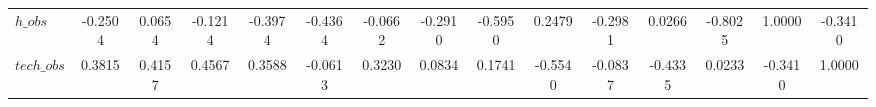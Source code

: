 \begin{center}
\begin{longtable}{lcccccccccccccc}
$h\_obs         $	 & 	          -0.2504	 & 	           0.0654	 & 	          -0.1214	 & 	          -0.3974	 & 	          -0.4364	 & 	          -0.0662	 & 	          -0.2910	 & 	          -0.5950	 & 	           0.2479	 & 	          -0.2981	 & 	           0.0266	 & 	          -0.8025	 & 	           1.0000	 & 	          -0.3410 \\ 
$tech\_obs      $	 & 	           0.3815	 & 	           0.4157	 & 	           0.4567	 & 	           0.3588	 & 	          -0.0613	 & 	           0.3230	 & 	           0.0834	 & 	           0.1741	 & 	          -0.5540	 & 	          -0.0837	 & 	          -0.4335	 & 	           0.0233	 & 	          -0.3410	 & 	           1.0000 \\ 
\end{longtable}
 \end{center}
